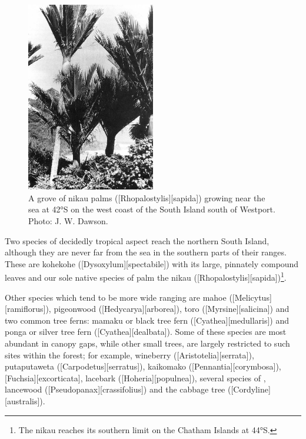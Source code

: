 \begin{figure}
	\includegraphics[width=0.5\textwidth]{graphics/figure60nikau.jpg}
	\centering
	\caption[A grove of nikau palms]{A grove of nikau palms ([Rhopalostylis][sapida]) growing near the sea at \ang{42}S on the west coast of the South Island south of Westport. Photo:  J. W. Dawson.}%
	\label{fig:60nikau}
\end{figure}

Two species of decidedly tropical aspect reach the northern South Island, although they are never far from the sea in the southern parts of their ranges.
These are kohekohe ([Dysoxylum][spectabile]) with its large, pinnately compound leaves and our sole native species of palm the nikau ([Rhopalostylis][sapida])\footnote{The nikau reaches its southern limit on the Chatham Islands at \ang{44}S.}.

Other species which tend to be more wide ranging are mahoe ([Melicytus][ramiflorus]), pigeonwood ([Hedycarya][arborea]), toro ([Myrsine][salicina]) and two common tree ferns: mamaku or black tree fern ([Cyathea][medullaris]) and ponga or silver tree fern ([Cyathea][dealbata]).
Some of these species are most abundant in canopy gaps, while other small trees, are largely restricted to such sites within the forest; for example, wineberry ([Aristotelia][serrata]), putaputaweta ([Carpodetus][serratus]), kaikomako ([Pennantia][corymbosa]),  [Fuchsia][excorticata], lacebark ([Hoheria][populnea]), several species of , lancewood ([Pseudopanax][crassifolius]) and the cabbage tree ([Cordyline][australis]).

